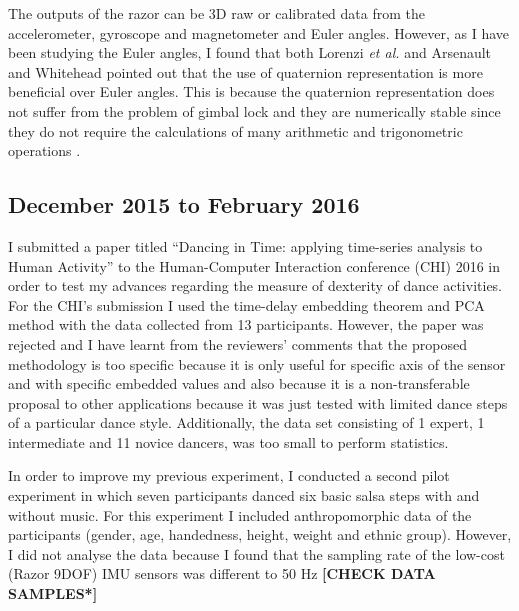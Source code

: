 \documentclass[9pt,journal,onecolumn,compsoc]{IEEEtran}
\begin{document}
The outputs of the razor can be 3D raw or calibrated data from the accelerometer,
gyroscope and magnetometer and Euler angles.
However, as I have been studying the Euler angles, I found that both Lorenzi \textit{et al.} 
and Arsenault and Whitehead pointed out that the use of quaternion representation is more beneficial over Euler angles.
This is because the quaternion representation does not suffer from the problem of gimbal lock
and they are numerically stable 
since they do not require the calculations of many arithmetic and trigonometric operations \cite{Lorenzi2015, Arsenault2015_a, Munkundan2002}.




\subsection{December 2015 to February 2016}

I submitted a paper titled ``Dancing in Time: applying time-series analysis to Human Activity''
to the Human-Computer Interaction conference (CHI) 2016 in order to test my advances regarding the measure of dexterity 
of dance activities. For the CHI's submission I used the time-delay embedding theorem and PCA method
with the data collected from 13 participants. However, the paper was rejected and 
I have learnt from the reviewers' comments that the proposed methodology is too specific 
because it is only useful for specific axis of the sensor and with specific 
embedded values and also because it is a non-transferable proposal to other applications
because it was just tested with limited dance steps of a particular dance style.
Additionally, the data set consisting of 1 expert, 
1 intermediate and 11 novice dancers, was too small to perform statistics.

In order to improve my previous experiment,
I conducted a second pilot experiment in which seven participants danced 
six basic salsa steps with and without music.
For this experiment I included anthropomorphic data of the participants 
(gender, age, handedness, height, weight and ethnic group).
However, I did not analyse the data because I found that the
sampling rate of the low-cost (Razor 9DOF) IMU sensors was different to 50 Hz \textbf{[CHECK DATA SAMPLES*]}
\end{document}
